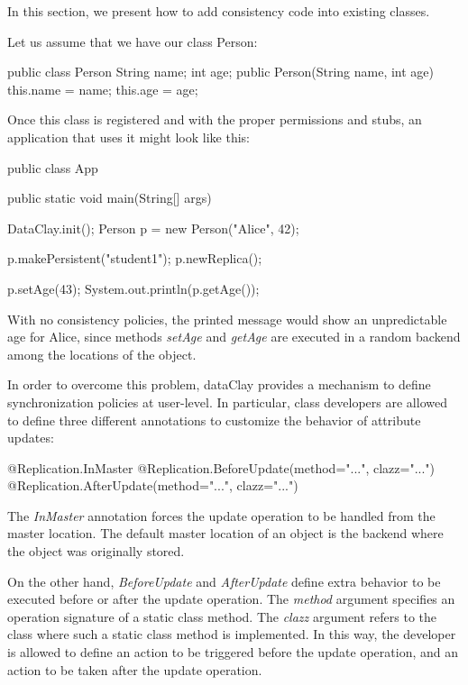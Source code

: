 In this section, we present how to add consistency code into existing classes.

Let us assume that we have our class Person:

\begin{tBox}
\begin{java}
public class Person {
  String name;
  int age;
  public Person(String name, int age) {
    this.name = name;
    this.age = age;
  }
}
\end{java}
\end{tBox}

Once this class is registered and with the proper permissions and stubs, an application that uses it might look like this:

\begin{tBox}
\begin{java}
public class App {
  public static void main(String[] args) {
    DataClay.init();
    Person p = new Person("Alice", 42);
    
    p.makePersistent("student1");
    p.newReplica();
    
    p.setAge(43);
    System.out.println(p.getAge());
  }
}
\end{java}
\end{tBox}

With no consistency policies, the printed message would show an unpredictable age for Alice, since methods \textit{setAge} and \textit{getAge} are executed in a random backend among the locations of the object.

In order to overcome this problem, dataClay provides a mechanism to define synchronization policies at user-level. In particular, class developers are allowed to define three different annotations to customize the behavior of attribute updates:

\begin{tBox}
\begin{java}
    @Replication.InMaster
    @Replication.BeforeUpdate(method="...", clazz="...")
    @Replication.AfterUpdate(method="...", clazz="...")
\end{java}
\end{tBox}

The \textit{InMaster} annotation forces the update operation to be handled from the master location. The default master location of an object is the backend where the object was originally stored.

On the other hand, \textit{BeforeUpdate} and \textit{AfterUpdate} define extra behavior to be executed before or after the update operation. The \textit{method} argument specifies an operation signature of a static class method. The \textit{clazz} argument refers to the class where such a static class method is implemented. In this way, the developer is allowed to define an action to be triggered before the update operation, and an action to be taken after the update operation.

